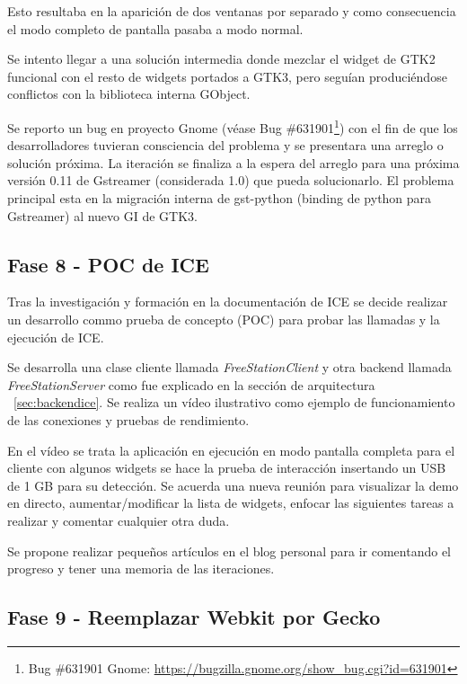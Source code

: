 Esto resultaba en la aparición de dos ventanas por separado y como consecuencia
el modo completo de pantalla pasaba a modo normal. 

\newpage

Se intento llegar a una
solución intermedia donde mezclar el widget de GTK2 funcional con el resto de 
widgets portados a GTK3, pero seguían produciéndose
conflictos con la biblioteca interna GObject.

Se reporto un bug en proyecto Gnome
(véase Bug \#631901\footnote{Bug \#631901 Gnome:
\url{https://bugzilla.gnome.org/show_bug.cgi?id=631901}\label{ftn:GnomeBug}})
con el fin de que los desarrolladores tuvieran consciencia del problema y se 
presentara una arreglo o solución próxima. La iteración se finaliza a la 
espera del arreglo para una próxima versión 0.11 de Gstreamer (considerada 
1.0) que pueda solucionarlo. El problema principal esta en la migración interna
de gst-python (binding de python para Gstreamer) al nuevo \acf{GI} de GTK3.

\subsection{Fase 8 - POC de ICE}

Tras la investigación y formación en la documentación de ICE se decide realizar
un desarrollo commo prueba de concepto (\acs{POC}\label{acro:POC}) para probar
las llamadas y la ejecución de ICE.

Se desarrolla una clase cliente llamada \emph{FreeStationClient} y otra backend
llamada \emph{FreeStationServer} como fue explicado en la sección de
arquitectura ~\ref{sec:backendice}. Se realiza un vídeo ilustrativo como ejemplo
de funcionamiento de las conexiones y pruebas de rendimiento.

En el vídeo se trata la aplicación en ejecución en modo pantalla completa para
el cliente con algunos widgets se hace la prueba de interacción insertando un
USB de 1 GB para su detección. Se acuerda una nueva reunión para visualizar la
demo en directo, aumentar/modificar la lista de widgets, enfocar las siguientes tareas a realizar
y comentar cualquier otra duda.

Se propone realizar pequeños artículos en el blog personal para ir comentando el
progreso y tener una memoria de las iteraciones.

\newpage

\subsection{Fase 9 - Reemplazar Webkit por Gecko}

